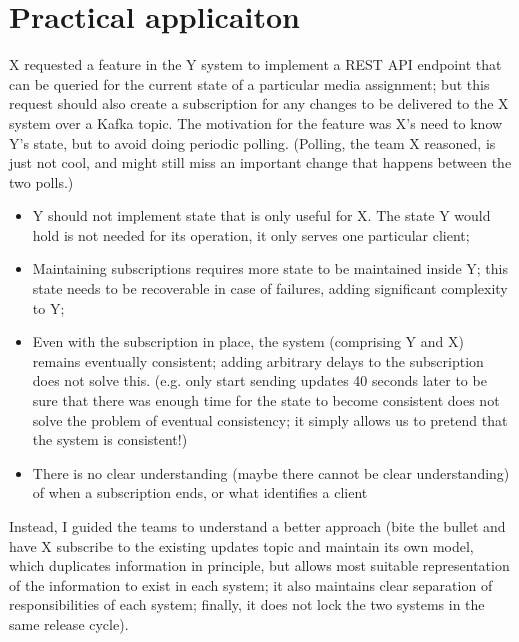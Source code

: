 \section{Practical applicaiton}
X requested a feature in the Y system to implement a REST API endpoint that can be queried for the current state of a particular media assignment; but this request should also create a subscription for any changes to be delivered to the X system over a Kafka topic. The motivation for the feature was X’s need to know Y’s state, but to avoid doing periodic polling. (Polling, the team X reasoned, is just not cool, and might still miss an important change that happens between the two polls.)
\begin{itemize}
  \item Y should not implement state that is only useful for X. The state Y would hold is not needed for its operation, it only serves one particular client;
  \item Maintaining subscriptions requires more state to be maintained inside Y; this state needs to be recoverable in case of failures, adding significant complexity to Y;
  \item  Even with the subscription in place, the system (comprising Y and X) remains eventually consistent; adding arbitrary delays to the subscription does not solve this. (e.g. only start sending updates 40 seconds later to be sure that there was enough time for the state to become consistent does not solve the problem of eventual consistency; it simply allows us to pretend that the system is consistent!)
  \item There is no clear understanding (maybe there cannot be clear understanding) of when a subscription ends, or what identifies a client
\end{itemize}
Instead, I guided the teams to understand a better approach (bite the bullet and have X subscribe to the existing updates topic and maintain its own model, which duplicates information in principle, but allows most suitable representation of the information to exist in each system; it also maintains clear separation of responsibilities of each system; finally, it does not lock the two systems in the same release cycle).


\printbibliography

